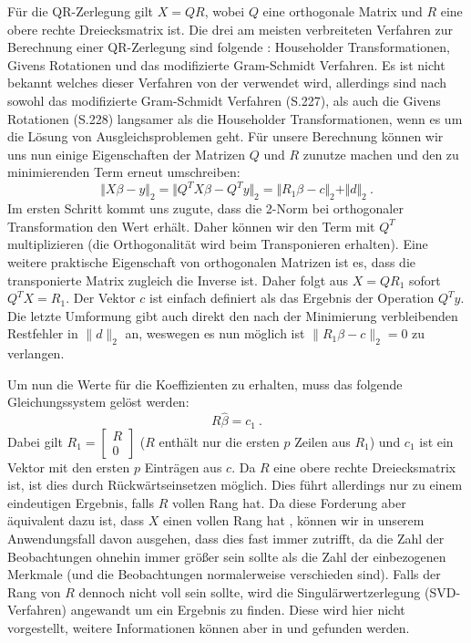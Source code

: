 Für die QR-Zerlegung gilt $X = QR$, wobei $Q$ eine orthogonale Matrix und $R$ eine obere rechte Dreiecksmatrix ist.
Die drei am meisten verbreiteten Verfahren zur Berechnung einer QR-Zerlegung sind folgende \citep[S. 211ff]{Golub1989}: Householder Transformationen, Givens Rotationen und das modifizierte Gram-Schmidt Verfahren.
Es ist nicht bekannt welches dieser Verfahren von der \naglib verwendet wird, allerdings sind nach \cite{Golub1989} sowohl das modifizierte Gram-Schmidt Verfahren (S.227), als auch die Givens Rotationen (S.228) langsamer als die Householder Transformationen, wenn es um die Lösung von Ausgleichsproblemen geht.
Für unsere Berechnung können wir uns nun einige Eigenschaften der Matrizen $Q$ und $R$ zunutze machen und den zu minimierenden Term erneut umschreiben:
\begin{equation*}
  \label{eq:orthogonal_transformation}
  \Vert X\beta - y \Vert_2 = \Vert Q^T X \beta - Q^T y \Vert_2 = \Vert R_1 \beta - c \Vert_2 + \Vert d \Vert_2 ~.
\end{equation*}
Im ersten Schritt kommt uns zugute, dass die 2-Norm bei orthogonaler Transformation den Wert erhält.
Daher können wir den Term mit $Q^T$ multiplizieren (die Orthogonalität wird beim Transponieren erhalten).
Eine weitere praktische Eigenschaft von orthogonalen Matrizen ist es, dass die transponierte Matrix zugleich die Inverse ist.
Daher folgt aus $X = QR_1$ sofort $Q^T X = R_1$.
Der Vektor $c$ ist einfach definiert als das Ergebnis der Operation $Q^T y$.
Die letzte Umformung gibt auch direkt den nach der Minimierung verbleibenden Restfehler in $\|d\|_2$ an, weswegen es nun möglich ist $\|R_1\beta - c\|_2 = 0$ zu verlangen.

Um nun die Werte für die Koeffizienten zu erhalten, muss das folgende Gleichungssystem gelöst werden:
\begin{equation*}
  R\hat\beta = c_1 ~.
\end{equation*}
Dabei gilt $R_1 = \begin{bmatrix} R \\ 0\end{bmatrix}$ ($R$ enthält nur die ersten $p$ Zeilen aus $R_1$) und $c_1$ ist ein Vektor mit den ersten $p$ Einträgen aus $c$. 
Da $R$ eine obere rechte Dreiecksmatrix ist, ist dies durch Rückwärtseinsetzen möglich.
Dies führt allerdings nur zu einem eindeutigen Ergebnis, falls $R$ vollen Rang hat.
Da diese Forderung aber äquivalent dazu ist, dass $X$ einen vollen Rang hat \citep[S. 225]{Golub1989}, können wir in unserem Anwendungsfall davon ausgehen, dass dies fast immer zutrifft, da die Zahl der Beobachtungen ohnehin immer größer sein sollte als die Zahl der einbezogenen Merkmale (und die Beobachtungen normalerweise verschieden sind).
Falls der Rang von $R$ dennoch nicht voll sein sollte, wird die Singulärwertzerlegung (SVD-Verfahren) angewandt um ein Ergebnis zu finden. 
Diese wird hier nicht vorgestellt, weitere Informationen können aber in \cite{nag:g02dac} und \citep[S. 239f]{Golub1989} gefunden werden.

